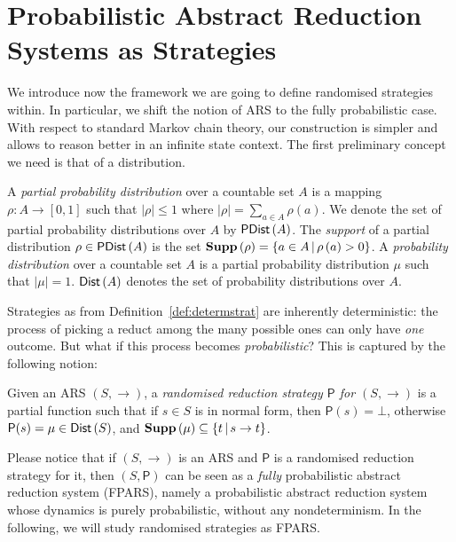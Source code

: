 \section{Probabilistic Abstract Reduction Systems as Strategies}
We introduce now the framework we are going to define randomised
strategies within. In particular, we shift the notion of ARS to the fully
probabilistic case. With respect to standard Markov chain theory, our
construction is simpler and allows to reason better in an infinite
state context. The first preliminary concept we need is that of a distribution.
\begin{definition}[Distribution]
	A \emph{partial probability distribution} over a countable set $A$
	is a mapping $\rho:A\rightarrow\left[0,1\right]$ such that
	$\left|\rho\right|\leq 1$ where
	$\left|\rho\right|=\underset{a\in A}{\sum}\rho\left(a\right)$. We denote the set of partial probability distributions over $A$
	by $\textsf{PDist}\left(A\right)$. The \emph{support} of a partial distribution
	$\rho\in\textsf{PDist}\left(A\right)$ is the set $\textbf{Supp}\left(\rho\right)=\left\lbrace a \in A \, |
	\, \rho\left( a\right) >0\right\rbrace $.  A \emph{probability
		distribution} over a countable set $A$ is a partial probability
	distribution $\mu$ such that $\left|\mu\right|=1$. $\textsf{Dist}\left(A\right)$ denotes the set
	of probability distributions over $A$.
\end{definition}
Strategies as from Definition~\ref{def:determstrat} are inherently
deterministic: the process of picking a reduct among the many possible
ones can only have \emph{one} outcome. But what if this process becomes
\emph{probabilistic}? This is captured by the following notion:
\begin{definition}
	Given an ARS $(S,\rightarrow)$, a
	\emph{randomised reduction strategy $\mathsf{P}$ for $(S,\rightarrow)$}
	is a partial function such that if $s\in S$ is in normal form, then
	$\mathsf{P}(s)=\bot$, otherwise $\mathsf{P}(s)=\mu\in\textsf{Dist}\left(S\right)$, and
	$\textbf{Supp}\left(\mu\right)\subseteq\{t\,|\,s\rightarrow t\}$.
\end{definition}
Please notice that if $(S,\rightarrow)$ is an ARS and 
$\mathsf{P}$ is a randomised reduction strategy for it,
then $(S,\mathsf{P})$ can be seen as a \emph{fully} probabilistic abstract
reduction system (FPARS), namely a probabilistic abstract reduction
system~\cite{avanzini_probabilistic_2018} whose dynamics is purely
probabilistic, without any nondeterminism. In the following, we will
study randomised strategies as FPARS.

